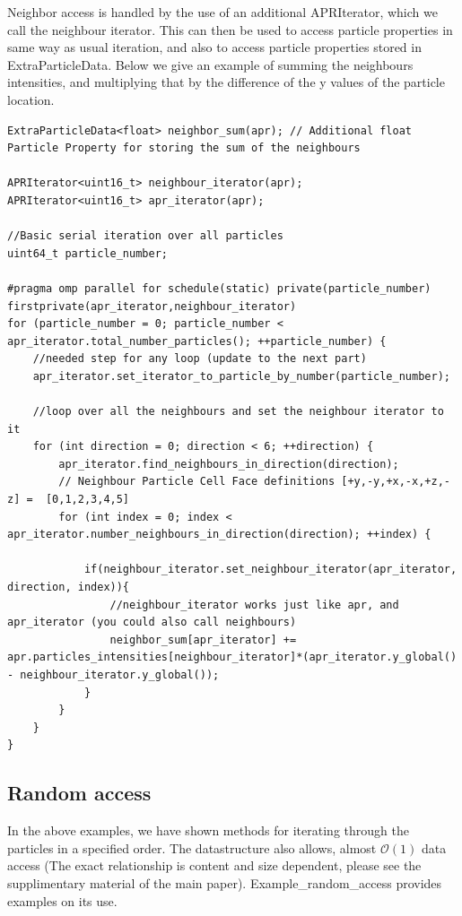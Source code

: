 \documentclass[12pt]{article}
\begin{document}
Neighbor access is handled by the use of an additional APRIterator, which we call the neighbour iterator. This can then be used to access particle properties in same way as usual iteration, and also to access particle properties stored in ExtraParticleData. Below we give an example of summing the neighbours intensities, and multiplying that by the difference of the y values of the particle location.
\begin{lstlisting}
ExtraParticleData<float> neighbor_sum(apr); // Additional float Particle Property for storing the sum of the neighbours

APRIterator<uint16_t> neighbour_iterator(apr);
APRIterator<uint16_t> apr_iterator(apr);

//Basic serial iteration over all particles
uint64_t particle_number;

#pragma omp parallel for schedule(static) private(particle_number) firstprivate(apr_iterator,neighbour_iterator)
for (particle_number = 0; particle_number < apr_iterator.total_number_particles(); ++particle_number) {
	//needed step for any loop (update to the next part)
	apr_iterator.set_iterator_to_particle_by_number(particle_number);

	//loop over all the neighbours and set the neighbour iterator to it
	for (int direction = 0; direction < 6; ++direction) {
		apr_iterator.find_neighbours_in_direction(direction);
		// Neighbour Particle Cell Face definitions [+y,-y,+x,-x,+z,-z] =  [0,1,2,3,4,5]
		for (int index = 0; index < apr_iterator.number_neighbours_in_direction(direction); ++index) {

			if(neighbour_iterator.set_neighbour_iterator(apr_iterator, direction, index)){
				//neighbour_iterator works just like apr, and apr_iterator (you could also call neighbours)
				neighbor_sum[apr_iterator] += apr.particles_intensities[neighbour_iterator]*(apr_iterator.y_global() - neighbour_iterator.y_global());
			}
		}
	}
}
\end{lstlisting}
\subsection{Random access}
In the above examples, we have shown methods for iterating through the particles in a specified order. The datastructure also allows, almost $\mathcal{O}(1)$ data access (The exact relationship is content and size dependent, please see the supplimentary material of the main paper). Example\_random\_access provides examples on its use.
\end{document}
